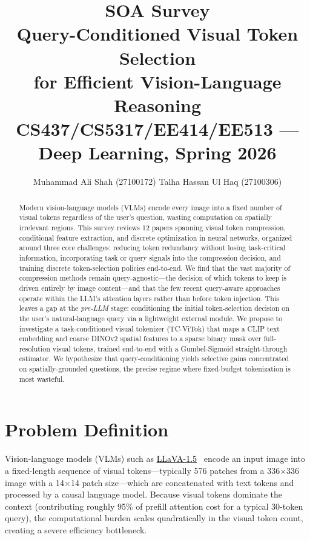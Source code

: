 \documentclass[11pt,twocolumn]{article}
\title{
    \vspace{-1cm}
    {\large \textbf{SOA Survey}} \\[0.3em]
    {\LARGE Query-Conditioned Visual Token Selection\\for Efficient Vision-Language Reasoning} \\[0.5em]
    {\normalsize CS437/CS5317/EE414/EE513 --- Deep Learning, Spring 2026}
}
\author{
    Muhammad Ali Shah (27100172) \quad Talha Hassan Ul Haq (27100306)
}
\date{}
\newcommand{\paperhref}[2]{\href{#1}{\textcolor{black}{#2}}}
\begin{document}
\maketitle
\thispagestyle{fancy}

\begin{abstract}
Modern vision-language models (VLMs) encode every image into a fixed number of visual tokens regardless of the user's question, wasting computation on spatially irrelevant regions. This survey reviews 12 papers spanning visual token compression, conditional feature extraction, and discrete optimization in neural networks, organized around three core challenges: reducing token redundancy without losing task-critical information, incorporating task or query signals into the compression decision, and training discrete token-selection policies end-to-end. We find that the vast majority of compression methods remain query-agnostic---the decision of which tokens to keep is driven entirely by image content---and that the few recent query-aware approaches operate within the LLM's attention layers rather than before token injection. This leaves a gap at the \emph{pre-LLM} stage: conditioning the initial token-selection decision on the user's natural-language query via a lightweight external module. We propose to investigate a task-conditioned visual tokenizer (TC-ViTok) that maps a CLIP text embedding and coarse DINOv2 spatial features to a sparse binary mask over full-resolution visual tokens, trained end-to-end with a Gumbel-Sigmoid straight-through estimator. We hypothesize that query-conditioning yields selective gains concentrated on spatially-grounded questions, the precise regime where fixed-budget tokenization is most wasteful.
\end{abstract}

\section{Problem Definition}
\label{sec:problem}

Vision-language models (VLMs) such as \paperhref{https://arxiv.org/abs/2304.08485}{LLaVA-1.5}~\cite{liu2024llava} encode an input image into a fixed-length sequence of visual tokens---typically 576 patches from a 336$\times$336 image with a 14$\times$14 patch size---which are concatenated with text tokens and processed by a causal language model. Because visual tokens dominate the context (contributing roughly 95\% of prefill attention cost for a typical 30-token query), the computational burden scales quadratically in the visual token count, creating a severe efficiency bottleneck.
\end{document}
